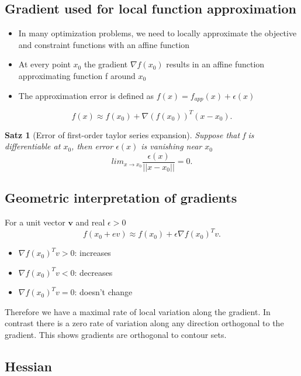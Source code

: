 \documentclass[11pt]{article}
\newtheorem{theorem}{Satz}
\begin{document}
 \subsection*{Gradient used for local function approximation}
 \begin{itemize}
    \item In many optimization problems, we need to locally approximate the objective and constraint functions with an affine function
    \item At every point $x_0$ the gradient $\nabla f(x_0)$ results in an affine function approximating function f around $x_0$
    \item The approximation error is defined as $f(x) = f_{app}(x) + \epsilon(x)$  
 \end{itemize}
 
 \[
 f(x) \approx f(x_0) + \nabla(f(x_0))^T(x-x_0)
 .\] 

 \begin{theorem}[Error of first-order taylor series expansion] Suppose that f is differentiable at $x_0$, then error $\epsilon(x)$ is vanishing near $x_0$
    \[
    lim_{x \to x_0} \frac{\epsilon(x)}{||x-x_0||} = 0
    .\]    
    
 \end{theorem}

 \subsection*{Geometric interpretation of gradients}
 For a unit vector $\mathbf{v}$ and real $\epsilon>0$ \[
f(x_0 + ev) \approx f(x_0) + \epsilon \nabla f(x_0)^T v
.\]  
\begin{itemize}
    \item $\nabla f(x_0)^T v > 0$: increases
    \item $\nabla f(x_0)^T v < 0$: decreases
    \item $\nabla f(x_0)^T v = 0$: doesn't change
\end{itemize}
Therefore we have a maximal rate of local variation along the gradient. In contrast there is a zero rate of variation along any direction orthogonal to the gradient. This shows gradients are orthogonal to contour sets.

\subsection*{Hessian}
 
 
\end{document}
